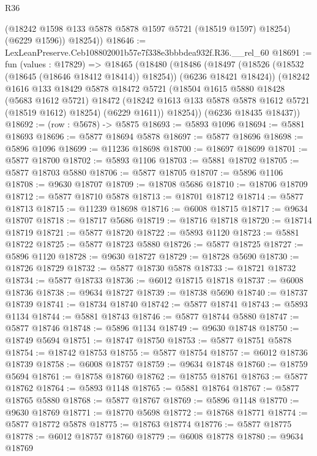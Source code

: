 \begin{lexlean}{R36}
\begin{coremodule}
          (@18242 @1598 @133 @5878 @5878 @1597 @5721 (@18519 @1597) @18254)
          (@6229 @1596))
        @18254))
@18646 := LexLeanPreserve.Ceb108802001b57e7f338e3bbbdea932f.R36.__rel_60
@18691 := fun (values : @17829) =>
  @18465
    (@18480
      (@18486
        (@18497 (@18526 (@18532 (@18645 (@18646 @18412 @18414)) @18254)) (@6236 @18421 @18424))
        (@18242
          @1616
          @133
          @18429
          @5878
          @18472
          @5721
          (@18504
            @1615
            @5880
            @18428
            (@5683 @1612 @5721)
            @18472
            (@18242 @1613 @133 @5878 @5878 @1612 @5721 (@18519 @1612) @18254)
            (@6229 @1611))
          @18254))
      (@6236 @18435 @18437))
@18692 := (row : @5678) -> @5875
@18693 := @5893 @1096
@18694 := @5881 @18693
@18696 := @5877 @18694 @5878
@18697 := @5877 @18696
@18698 := @5896 @1096
@18699 := @11236 @18698
@18700 := @18697 @18699
@18701 := @5877 @18700
@18702 := @5893 @1106
@18703 := @5881 @18702
@18705 := @5877 @18703 @5880
@18706 := @5877 @18705
@18707 := @5896 @1106
@18708 := @9630 @18707
@18709 := @18708 @5686
@18710 := @18706 @18709
@18712 := @5877 @18710 @5878
@18713 := @18701 @18712
@18714 := @5877 @18713
@18715 := @11239 @18698
@18716 := @6008 @18715
@18717 := @9634 @18707
@18718 := @18717 @5686
@18719 := @18716 @18718
@18720 := @18714 @18719
@18721 := @5877 @18720
@18722 := @5893 @1120
@18723 := @5881 @18722
@18725 := @5877 @18723 @5880
@18726 := @5877 @18725
@18727 := @5896 @1120
@18728 := @9630 @18727
@18729 := @18728 @5690
@18730 := @18726 @18729
@18732 := @5877 @18730 @5878
@18733 := @18721 @18732
@18734 := @5877 @18733
@18736 := @6012 @18715 @18718
@18737 := @6008 @18736
@18738 := @9634 @18727
@18739 := @18738 @5690
@18740 := @18737 @18739
@18741 := @18734 @18740
@18742 := @5877 @18741
@18743 := @5893 @1134
@18744 := @5881 @18743
@18746 := @5877 @18744 @5880
@18747 := @5877 @18746
@18748 := @5896 @1134
@18749 := @9630 @18748
@18750 := @18749 @5694
@18751 := @18747 @18750
@18753 := @5877 @18751 @5878
@18754 := @18742 @18753
@18755 := @5877 @18754
@18757 := @6012 @18736 @18739
@18758 := @6008 @18757
@18759 := @9634 @18748
@18760 := @18759 @5694
@18761 := @18758 @18760
@18762 := @18755 @18761
@18763 := @5877 @18762
@18764 := @5893 @1148
@18765 := @5881 @18764
@18767 := @5877 @18765 @5880
@18768 := @5877 @18767
@18769 := @5896 @1148
@18770 := @9630 @18769
@18771 := @18770 @5698
@18772 := @18768 @18771
@18774 := @5877 @18772 @5878
@18775 := @18763 @18774
@18776 := @5877 @18775
@18778 := @6012 @18757 @18760
@18779 := @6008 @18778
@18780 := @9634 @18769

\end{coremodule}
\end{lexlean}

